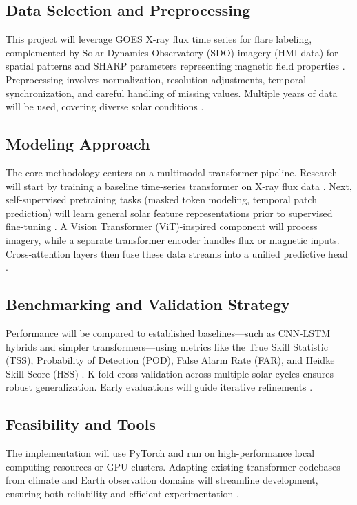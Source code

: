 \subsection{Data Selection and Preprocessing}
This project will leverage GOES X-ray flux time series for flare labeling, complemented by Solar Dynamics Observatory (SDO) imagery (HMI data) for spatial patterns and SHARP parameters representing magnetic field properties \cite{RefWorks:RefID:2-abduallah2023operational, RefWorks:RefID:12-zheng2023comparative}. Preprocessing involves normalization, resolution adjustments, temporal synchronization, and careful handling of missing values. Multiple years of data will be used, covering diverse solar conditions \cite{RefWorks:RefID:13-yıldız2023effect}.

\subsection{Modeling Approach}
The core methodology centers on a multimodal transformer pipeline. Research will start by training a baseline time-series transformer on X-ray flux data \cite{RefWorks:RefID:3-vaswani2023provided}. Next, self-supervised pretraining tasks (masked token modeling, temporal patch prediction) will learn general solar feature representations prior to supervised fine-tuning \cite{RefWorks:RefID:21-fedus2022switch, RefWorks:RefID:29-hoffmanntraining}. A Vision Transformer (ViT)-inspired component will process imagery, while a separate transformer encoder handles flux or magnetic inputs. Cross-attention layers then fuse these data streams into a unified predictive head \cite{RefWorks:RefID:2-abduallah2023operational}.

\subsection{Benchmarking and Validation Strategy}
Performance will be compared to established baselines—such as CNN-LSTM hybrids and simpler transformers—using metrics like the True Skill Statistic (TSS), Probability of Detection (POD), False Alarm Rate (FAR), and Heidke Skill Score (HSS) \cite{RefWorks:RefID:12-zheng2023comparative}. K-fold cross-validation across multiple solar cycles ensures robust generalization. Early evaluations will guide iterative refinements \cite{RefWorks:RefID:13-yıldız2023effect}.

\subsection{Feasibility and Tools}
The implementation will use PyTorch and run on high-performance local computing resources or GPU clusters. Adapting existing transformer codebases from climate and Earth observation domains will streamline development, ensuring both reliability and efficient experimentation \cite{RefWorks:RefID:3-vaswani2023provided, RefWorks:RefID:1-gettelman1997future, RefWorks:RefID:30-schmude2024prithvi}.
